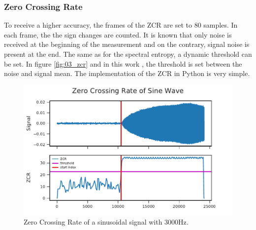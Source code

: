 
\subsubsection*{Zero Crossing Rate}

To receive a higher accuracy, the frames of the \ac{ZCR} are set to 80 samples.
In each frame, the the sign changes are counted.
It is known that only noise is received at the beginning of the measurement and on the
contrary, signal noise is present at the end.
The same as for the spectral entropy, a dynamic threshold can be set.
In figure \cref{fig:03_zcr} and in this work , the threshold is set between the
noise and signal mean.
The implementation of the \ac{ZCR} in Python is very simple.

\begin{figure}[ht]
	\centering
		\includegraphics[]{figures/sine_zcr}
	\caption{Zero Crossing Rate of a sinusoidal signal with 3000Hz.}
\end{figure}
\label{fig:03_zcr}
